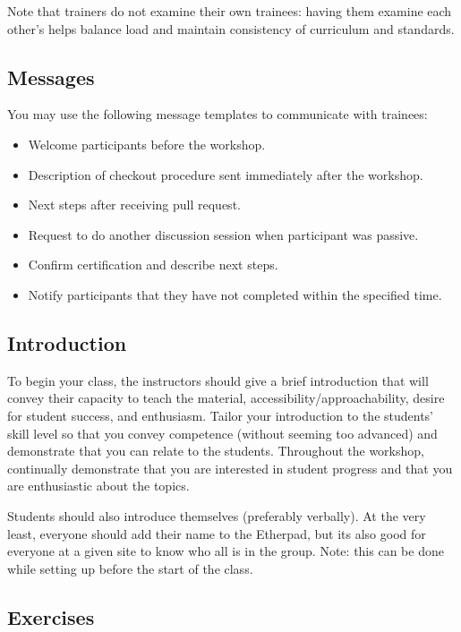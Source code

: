 Note that trainers do not examine their own trainees: having them
examine each other's helps balance load and maintain consistency of
curriculum and standards.

\subsection{Messages}\label{messages}

You may use the following message templates to communicate with
trainees:

\begin{itemize}
\itemsep1pt\parskip0pt
\item
  Welcome participants before the workshop.
\item
  Description of checkout procedure sent immediately after the workshop.
\item
  Next steps after receiving pull request.
\item
  Request to do another discussion session when participant was passive.
\item
  Confirm certification and describe next steps.
\item
  Notify participants that they have not completed within the specified time.
\end{itemize}

\subsection{Introduction}\label{introduction}

To begin your class, the instructors should give a brief introduction
that will convey their capacity to teach the material,
accessibility/approachability, desire for student success, and
enthusiasm. Tailor your introduction to the students' skill level so
that you convey competence (without seeming too advanced) and
demonstrate that you can relate to the students. Throughout the
workshop, continually demonstrate that you are interested in student
progress and that you are enthusiastic about the topics.

Students should also introduce themselves (preferably verbally). At the
very least, everyone should add their name to the Etherpad, but its also
good for everyone at a given site to know who all is in the group. Note:
this can be done while setting up before the start of the class.

\subsection{Exercises}\label{exercises}


